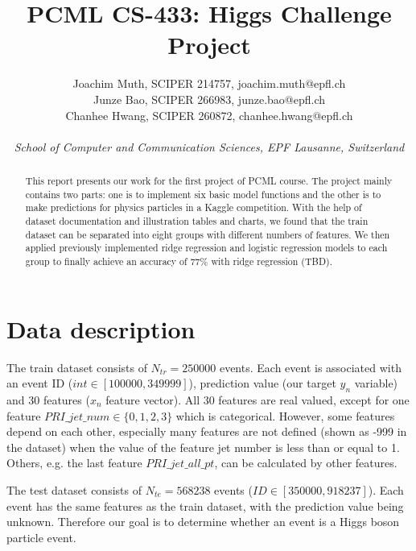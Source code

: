 \documentclass[10pt,conference,compsocconf]{IEEEtran}
\begin{document}
\title{PCML CS-433: Higgs Challenge Project}

\author{
  Joachim Muth, SCIPER 214757, joachim.muth@epfl.ch\\
  Junze Bao, SCIPER 266983, junze.bao@epfl.ch\\
  Chanhee Hwang, SCIPER 260872, chanhee.hwang@epfl.ch\\ \\
  \textit{School of Computer and Communication Sciences, EPF Lausanne, Switzerland}
}

\maketitle

\begin{abstract}
This report presents our work for the first project of PCML course. The project mainly contains two parts: one is to implement six basic model functions and the other is to make predictions for physics particles in a Kaggle competition. With the help of dataset documentation and illustration tables and charts, we found that the train dataset can be separated into eight groups with different numbers of features. We then applied previously implemented ridge regression and logistic regression models to each group to finally achieve an accuracy of {\color{red} 77\% with ridge regression (TBD)}.
\end{abstract}

\section{Data description}
The train dataset consists of $N_{tr} = 250000$ events. Each event is associated with an event ID ($int \in [100000, 349999]$), prediction value (our target \textbf{$y_n$} variable) and 30 features (\textbf{$x_n$} feature vector). All 30 features are real valued, except for one feature $PRI\_jet\_num \in \{0, 1, 2, 3\}$ which is categorical. However, some features depend on each other, especially many features are not defined (shown as -999 in the dataset) when the value of the feature jet number is less than or equal to 1. Others, e.g. the last feature $PRI\_jet\_all\_pt$, can be calculated by other features.

The test dataset consists of $N_{te} = 568238$ events ($ID \in [350000, 918237]$). Each event has the same features as the train dataset, with the prediction value being unknown. Therefore our goal is to determine whether an event is a Higgs boson particle event.
\end{document}
